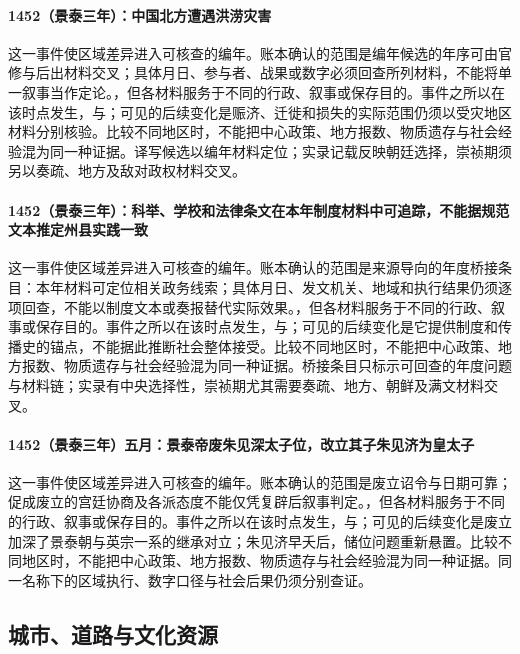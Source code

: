 \paragraph{1452（景泰三年）：中国北方遭遇洪涝灾害} 这一事件使区域差异进入可核查的编年。账本确认的范围是编年候选的年序可由官修与后出材料交叉；具体月日、参与者、战果或数字必须回查所列材料，不能将单一叙事当作定论。，但各材料服务于不同的行政、叙事或保存目的。事件之所以在该时点发生，与；可见的后续变化是赈济、迁徙和损失的实际范围仍须以受灾地区材料分别核验。比较不同地区时，不能把中心政策、地方报数、物质遗存与社会经验混为同一种证据。译写候选以编年材料定位；实录记载反映朝廷选择，崇祯期须另以奏疏、地方及敌对政权材料交叉。

\paragraph{1452（景泰三年）：科举、学校和法律条文在本年制度材料中可追踪，不能据规范文本推定州县实践一致} 这一事件使区域差异进入可核查的编年。账本确认的范围是来源导向的年度桥接条目：本年材料可定位相关政务线索；具体月日、发文机关、地域和执行结果仍须逐项回查，不能以制度文本或奏报替代实际效果。，但各材料服务于不同的行政、叙事或保存目的。事件之所以在该时点发生，与；可见的后续变化是它提供制度和传播史的锚点，不能据此推断社会整体接受。比较不同地区时，不能把中心政策、地方报数、物质遗存与社会经验混为同一种证据。桥接条目只标示可回查的年度问题与材料链；实录有中央选择性，崇祯期尤其需要奏疏、地方、朝鲜及满文材料交叉。

\paragraph{1452（景泰三年）五月：景泰帝废朱见深太子位，改立其子朱见济为皇太子} 这一事件使区域差异进入可核查的编年。账本确认的范围是废立诏令与日期可靠；促成废立的宫廷协商及各派态度不能仅凭复辟后叙事判定。，但各材料服务于不同的行政、叙事或保存目的。事件之所以在该时点发生，与；可见的后续变化是废立加深了景泰朝与英宗一系的继承对立；朱见济早夭后，储位问题重新悬置。比较不同地区时，不能把中心政策、地方报数、物质遗存与社会经验混为同一种证据。同一名称下的区域执行、数字口径与社会后果仍须分别查证。

\subsection{城市、道路与文化资源}

